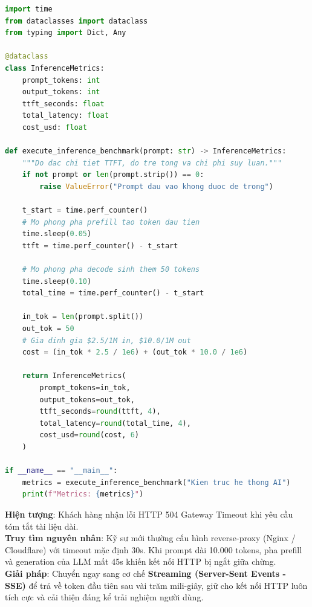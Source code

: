 \begin{labbox}
\begin{lstlisting}[language=Python]
import time
from dataclasses import dataclass
from typing import Dict, Any

@dataclass
class InferenceMetrics:
    prompt_tokens: int
    output_tokens: int
    ttft_seconds: float
    total_latency: float
    cost_usd: float

def execute_inference_benchmark(prompt: str) -> InferenceMetrics:
    """Do dac chi tiet TTFT, do tre tong va chi phi suy luan."""
    if not prompt or len(prompt.strip()) == 0:
        raise ValueError("Prompt dau vao khong duoc de trong")
        
    t_start = time.perf_counter()
    # Mo phong pha prefill tao token dau tien
    time.sleep(0.05) 
    ttft = time.perf_counter() - t_start
    
    # Mo phong pha decode sinh them 50 tokens
    time.sleep(0.10)
    total_time = time.perf_counter() - t_start
    
    in_tok = len(prompt.split())
    out_tok = 50
    # Gia dinh gia $2.5/1M in, $10.0/1M out
    cost = (in_tok * 2.5 / 1e6) + (out_tok * 10.0 / 1e6)
    
    return InferenceMetrics(
        prompt_tokens=in_tok,
        output_tokens=out_tok,
        ttft_seconds=round(ttft, 4),
        total_latency=round(total_time, 4),
        cost_usd=round(cost, 6)
    )

if __name__ == "__main__":
    metrics = execute_inference_benchmark("Kien truc he thong AI")
    print(f"Metrics: {metrics}")
\end{lstlisting}
\end{labbox}

\begin{debugbox}
\textbf{Hiện tượng}: Khách hàng nhận lỗi HTTP 504 Gateway Timeout khi yêu cầu tóm tắt tài liệu dài.\\
\textbf{Truy tìm nguyên nhân}: Kỹ sư mới thường cấu hình reverse-proxy (Nginx / Cloudflare) với timeout mặc định 30s. Khi prompt dài 10.000 tokens, pha prefill và generation của LLM mất 45s khiến kết nối HTTP bị ngắt giữa chừng.\\
\textbf{Giải pháp}: Chuyển ngay sang cơ chế \textbf{Streaming (Server-Sent Events - SSE)} để trả về token đầu tiên sau vài trăm mili-giây, giữ cho kết nối HTTP luôn tích cực và cải thiện đáng kể trải nghiệm người dùng.
\end{debugbox}

